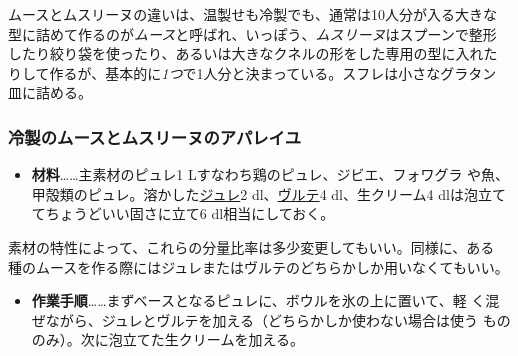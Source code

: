 ムースとムスリーヌの違いは、温製せも冷製でも、通常は10人分が入る大きな
型に詰めて作るのが\emph{ムース}と呼ばれ、いっぽう、\emph{ムスリーヌ}はスプーンで整形
したり絞り袋を使ったり、あるいは大きなクネルの形をした専用の型に入れた
りして作るが、基本的に\emph{1つ}で1人分と決まっている。スフレは小さなグラタン
皿に詰める。
\begin{recette}
\hypertarget{composition-de-l-appareil-pour-mousses-et-mousseline-froides}{%
\subsubsection{冷製のムースとムスリーヌのアパレイユ}\label{composition-de-l-appareil-pour-mousses-et-mousseline-froides}}



\begin{itemize}
\tightlist
\item
  \textbf{材料}\ldots{}\ldots{}主素材のピュレ1
  Lすなわち鶏のピュレ、ジビエ、フォワグラ
  や魚、甲殻類のピュレ。溶かした\protect\hyperlink{gelees-ordinaires}{ジュレ}2\undemi{}
  dl、\protect\hyperlink{veloute}{ヴルテ}4 dl、生クリーム4
  dlは泡立ててちょうどいい固さに立て6 dl相当にしておく。
\end{itemize}

素材の特性によって、これらの分量比率は多少変更してもいい。同様に、ある
種のムースを作る際にはジュレまたはヴルテのどちらかしか用いなくてもいい。

\begin{itemize}
\tightlist
\item
  \textbf{作業手順}\ldots{}\ldots{}まずベースとなるピュレに、ボウルを氷の上に置いて、軽
  く混ぜながら、ジュレとヴルテを加える（どちらかしか使わない場合は使う
  もののみ）。次に泡立てた生クリームを加える。
\end{itemize}


\end{recette}
